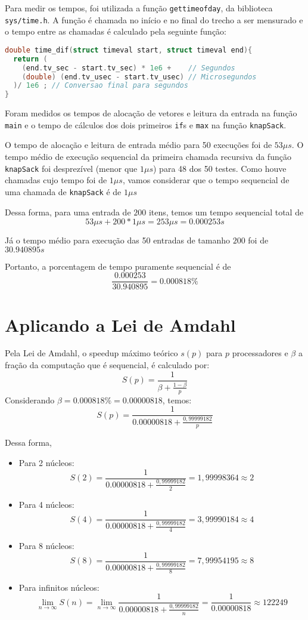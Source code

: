 \documentclass{article}
\begin{document}
Para medir os tempos, foi utilizada a função 
\texttt{gettimeofday}, da biblioteca \texttt{sys/time.h}.
A função é chamada no início e no final do trecho 
a ser mensurado e o tempo entre as chamadas é calculado
pela seguinte função:

\begin{lstlisting}[language=c]
double time_dif(struct timeval start, struct timeval end){
  return ( 
    (end.tv_sec - start.tv_sec) * 1e6 +    // Segundos
    (double) (end.tv_usec - start.tv_usec) // Microsegundos
  )/ 1e6 ; // Conversao final para segundos
}
\end{lstlisting}
Foram medidos os tempos de alocação de vetores e 
leitura da entrada na função \texttt{main} e o tempo 
de cálculos dos dois primeiros \texttt{if}s e \texttt{max} 
na função \texttt{knapSack}.

O tempo de alocação e leitura de entrada médio para 50 execuções
foi de $53 \mu s$.
O tempo médio de execução sequencial da primeira chamada 
recursiva da função \texttt{knapSack} foi desprezível (menor
que $1 \mu s$) para 48 dos 50 testes. Como houve chamadas cujo
tempo foi de $1 \mu s$, vamos considerar que o tempo sequencial 
de uma chamada de \texttt{knapSack} é de $1 \mu s$

Dessa forma, para uma entrada de $200$ itens, temos um tempo 
sequencial total de 
$$53 \mu s + 200 * 1 \mu s = 253 \mu s = 0.000253 s$$

Já o tempo médio para execução das 50 entradas de tamanho $200$
foi de $30.940895s$

Portanto, a porcentagem de tempo puramente sequencial é de 
$$ \frac{0.000253}{30.940895} = 0.000818\%$$

\section{Aplicando a Lei de Amdahl}
Pela Lei de Amdahl, o speedup máximo teórico $s(p)$ para $p$
processadores e $\beta$ a fração da computação que é sequencial,
é calculado por:
$$ S(p) = \frac{1}{\beta + \frac{1 - \beta}{p}} $$
Considerando $\beta = 0.000818\% = 0.00000818$, temos:
$$ S(p) = \frac{1}{0.00000818 + \frac{0,99999182}{p}} $$

Dessa forma,
\begin{itemize}
  \item Para 2 núcleos: 
    $$S(2) =  \frac{1}{0.00000818 + \frac{0,99999182}{2}} = 1,99998364 \approx 2$$
  \item Para 4 núcleos: 
    $$S(4) =  \frac{1}{0.00000818 + \frac{0,99999182}{4}} = 3,99990184 \approx 4$$
  \item Para 8 núcleos: 
    $$S(8) =  \frac{1}{0.00000818 + \frac{0,99999182}{8}} = 7,99954195 \approx 8$$
  \item Para infinitos núcleos: 
    $$\lim_{n \rightarrow \infty} S(n) = 
    \lim_{n \rightarrow \infty} \frac{1}{0.00000818 + \frac{0,99999182}{n}} = 
    \frac{1}{0.00000818} \approx 122249$$
\end{itemize}
\end{document}
